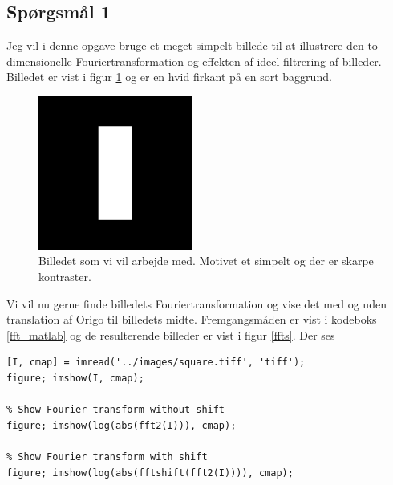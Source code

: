 \documentclass[a4paper, 10pt, danish, final]{article}
\title{\mytitle}
\subtitle{\mysubtitle}
\author{\myauthor{} - \mymail}
\date{\mydate}
\begin{document}
\maketitle

\subsection*{Spørgsmål 1}
Jeg vil i denne opgave bruge et meget simpelt billede til at illustrere
den to-dimensionelle Fouriertransformation og effekten af ideel
filtrering af billeder. Billedet er vist i figur \ref{square} og er en
hvid firkant på en sort baggrund.

\begin{figure}[!h]
    \centering
    \includegraphics[angle=0,width=0.45\textwidth]{images/square}
    \caption[]{Billedet som vi vil arbejde med. Motivet et simpelt og
    der er skarpe kontraster.}
    \label{square}
\end{figure}

Vi vil nu gerne finde billedets Fouriertransformation og vise det med og
uden translation af Origo til billedets midte. Fremgangsmåden er vist i
kodeboks \ref{fft_matlab} og de resulterende billeder er vist i figur
\ref{ffts}. Der ses

\begin{lstlisting}[caption={Fouriertransformation i MATLAB},
    captionpos=b, label={fft_matlab}, float=t, numbers=none]
% Read and show the original image
[I, cmap] = imread('../images/square.tiff', 'tiff');
figure; imshow(I, cmap);

% Show Fourier transform without shift
figure; imshow(log(abs(fft2(I))), cmap);

% Show Fourier transform with shift
figure; imshow(log(abs(fftshift(fft2(I)))), cmap);
\end{lstlisting}
\end{document}
